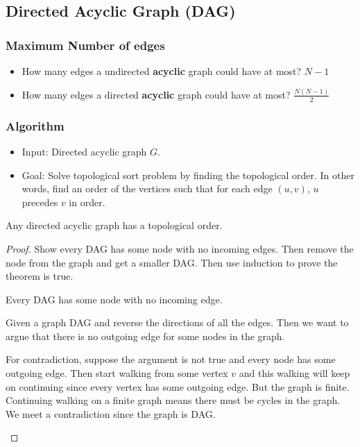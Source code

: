 \subsection{Directed Acyclic Graph (DAG)}
\subsubsection{Maximum Number of edges}
\begin{itemize}
\item How many edges a undirected \textbf{acyclic} graph could have at most? 
$N-1$
\item How many edges a directed \textbf{acyclic} graph could have at most? 
$\frac{N(N-1)}{2}$
\end{itemize}
\subsubsection{Algorithm}
\begin{itemize}
 \item Input: Directed acyclic graph $G$.
 \item Goal: Solve topological sort problem by finding the topological order. 
In other words, find an order of the vertices such that for each edge $(u, v)$, 
$u$ precedes $v$ in order.
\end{itemize}
\begin{theorem}
 Any directed acyclic graph has a topological order.
\end{theorem}

\begin{proof}
Show every DAG has some node with no incoming edges. Then remove the node from 
the graph and get a smaller DAG. Then use induction to prove the theorem is 
true.

\begin{claim}
Every DAG has some node with no incoming edge.
\end{claim}
\begin{claimproof}
Given a graph DAG and reverse the directions of all the edges. Then we want to 
argue that there is no outgoing edge for some nodes in the graph.

For contradiction, suppose the argument is not true and every node has some 
outgoing edge. Then start walking from some vertex $v$ and this walking will 
keep on continuing since every vertex has some outgoing edge. But the graph is 
finite. Continuing walking on a finite graph means there must be cycles in the 
graph. We meet a contradiction since the graph is DAG.
\end{claimproof}
\end{proof}

